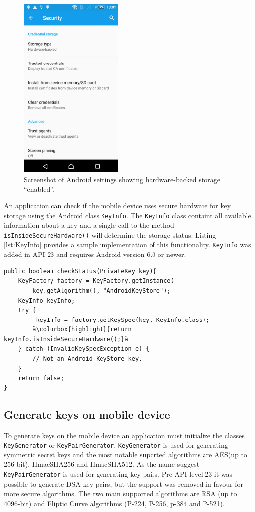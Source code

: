 \begin{figure}[h!]
  \caption{Screenshot of Android settings showing hardware-backed storage ``enabled''.}
  \label{fig:hardwareBacked}
  \centering
    \includegraphics[width=0.45\textwidth]{images/hardwareBacked.png}
\end{figure}

An application can check if the mobile device uses secure hardware for key storage using the Android class \texttt{KeyInfo}. The \texttt{KeyInfo} class containt all available information about a key and a single call to the method \texttt{\allowbreak isInsideSecureHardware()} will determine the storage status. Listing \ref{lst:KeyInfo} provides a sample implementation of this functionality. \texttt{KeyInfo} was added in API 23 and requires Android version 6.0 or newer.

\newpage
\begin{lstlisting}[caption=Obtaining storage status of keys using KeyInfo., label=lst:KeyInfo,escapechar=å]
public boolean checkStatus(PrivateKey key){
    KeyFactory factory = KeyFactory.getInstance(
        key.getAlgorithm(), "AndroidKeyStore");
    KeyInfo keyInfo;
    try {
         keyInfo = factory.getKeySpec(key, KeyInfo.class);
        å\colorbox{highlight}{return keyInfo.isInsideSecureHardware();}å
    } catch (InvalidKeySpecException e) {
        // Not an Android KeyStore key.
    }
    return false;
}
\end{lstlisting}

\subsection{Generate keys on mobile device}
To generate keys on the mobile device an application must initialize the classes \texttt{KeyGenerator} or \texttt{KeyPairGenerator}. \texttt{KeyGenerator} is used for generating symmetric secret keys and the most notable suported algorithms are AES(up to 256-bit), HmacSHA256 and HmacSHA512. As the name suggest \texttt{KeyPairGenerator} is used for generating key-pairs. Pre API level 23 it was possible to generate DSA key-pairs, but the support was removed in favour for more secure algorithms. The two main supported algorithms are RSA (up to 4096-bit) and Eliptic Curve algorithms (P-224, P-256, p-384 and P-521).

